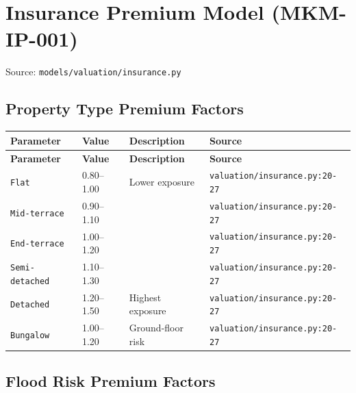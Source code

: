 \documentclass[11pt,a4paper]{article}
\begin{document}
\clearpage

\section{Insurance Premium Model (MKM-IP-001)}

Source: \texttt{models/valuation/insurance.py}

\subsection{Property Type Premium Factors}

\begin{longtable}{p{4cm}p{4cm}p{5.5cm}p{3.5cm}}
    \toprule
    \textbf{Parameter} & \textbf{Value} & \textbf{Description} & \textbf{Source} \\
    \midrule
    \endfirsthead
    \toprule
    \textbf{Parameter} & \textbf{Value} & \textbf{Description} & \textbf{Source} \\
    \midrule
    \endhead
    \bottomrule
    \endfoot
    \texttt{Flat} & 0.80--1.00 & Lower exposure & {\scriptsize \texttt{valuation/insurance.py:20-27}} \\
    \texttt{Mid-terrace} & 0.90--1.10 &  & {\scriptsize \texttt{valuation/insurance.py:20-27}} \\
    \texttt{End-terrace} & 1.00--1.20 &  & {\scriptsize \texttt{valuation/insurance.py:20-27}} \\
    \texttt{Semi-detached} & 1.10--1.30 &  & {\scriptsize \texttt{valuation/insurance.py:20-27}} \\
    \texttt{Detached} & 1.20--1.50 & Highest exposure & {\scriptsize \texttt{valuation/insurance.py:20-27}} \\
    \texttt{Bungalow} & 1.00--1.20 & Ground-floor risk & {\scriptsize \texttt{valuation/insurance.py:20-27}} \\
\end{longtable}

\subsection{Flood Risk Premium Factors}
\end{document}
